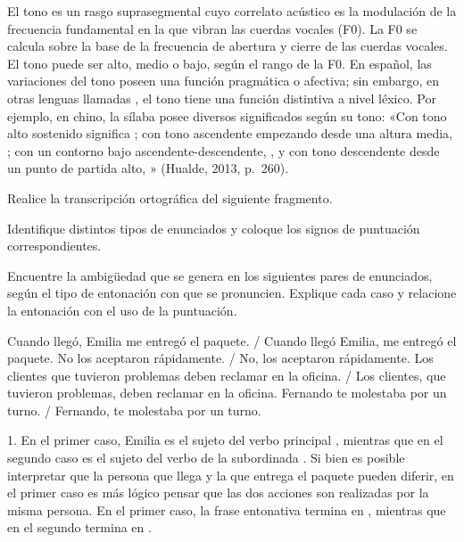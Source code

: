 \begin{recuadro}[El tono]
El tono es un rasgo suprasegmental cuyo correlato acústico es la modulación de
la frecuencia fundamental en la que vibran las cuerdas vocales (F0). La F0 se
calcula sobre la base de la frecuencia de abertura y cierre de las cuerdas
vocales. El tono puede ser alto, medio o bajo, según el rango de la F0. En
español, las variaciones del tono poseen una función pragmática o afectiva; sin
embargo, en otras lenguas llamadas , el tono tiene una
función distintiva a nivel léxico. Por ejemplo, en chino, la sílaba 
posee diversos significados según su tono: «Con tono alto sostenido significa
; con tono ascendente empezando desde una altura media,
; con un contorno bajo ascendente-descendente, , y con
tono descendente desde un punto de partida alto, » (Hualde, 2013,
p.~260).
\end{recuadro}

\begin{ejercicio}\label{ej:03-puntuacion}
\begin{consignas}
  \item Realice la transcripción ortográfica del siguiente fragmento.
  \item Identifique distintos tipos de enunciados y coloque los signos de
        puntuación correspondientes.
\end{consignas}

\end{ejercicio}

\begin{ejercicio}\label{ej:03-ambiguedad}
Encuentre la ambigüedad que se genera en los siguientes pares de enunciados,
según el tipo de entonación con que se pronuncien. Explique cada caso y
relacione la entonación con el uso de la puntuación.

\begin{exe}
  \ex Cuando llegó, Emilia me entregó el paquete. / Cuando llegó Emilia, me
      entregó el paquete.
  \ex No los aceptaron rápidamente. / No, los aceptaron rápidamente.
  \ex Los clientes que tuvieron problemas deben reclamar en la oficina. / Los
      clientes, que tuvieron problemas, deben reclamar en la oficina.
  \ex Fernando te molestaba por un turno. / Fernando, te molestaba por un
      turno.
\end{exe}

\begin{resuelto}
1. En el primer caso, Emilia es el sujeto del verbo principal
, mientras que en el segundo caso es el sujeto del verbo de la
subordinada . Si bien es posible interpretar que la persona que
llega y la que entrega el paquete pueden diferir, en el primer caso es más
lógico pensar que las dos acciones son realizadas por la misma persona. En el
primer caso, la frase entonativa termina en , mientras que en el
segundo termina en .
\end{resuelto}
\end{ejercicio}

